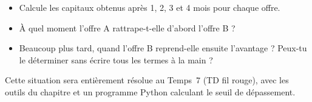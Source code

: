 \begin{itemize}
  \item Calcule les capitaux obtenus après 1, 2, 3 et 4 mois pour chaque offre.
  \item À quel moment l'offre A rattrape-t-elle d'abord l'offre B ?
  \item Beaucoup plus tard, quand l'offre B reprend-elle ensuite l'avantage ?
  Peux-tu le déterminer sans écrire tous les termes à la main ?
\end{itemize}

Cette situation sera entièrement résolue au Temps~7 (TD fil rouge), avec les outils du chapitre et un programme Python calculant le seuil de dépassement.

%
%
%
%
%
